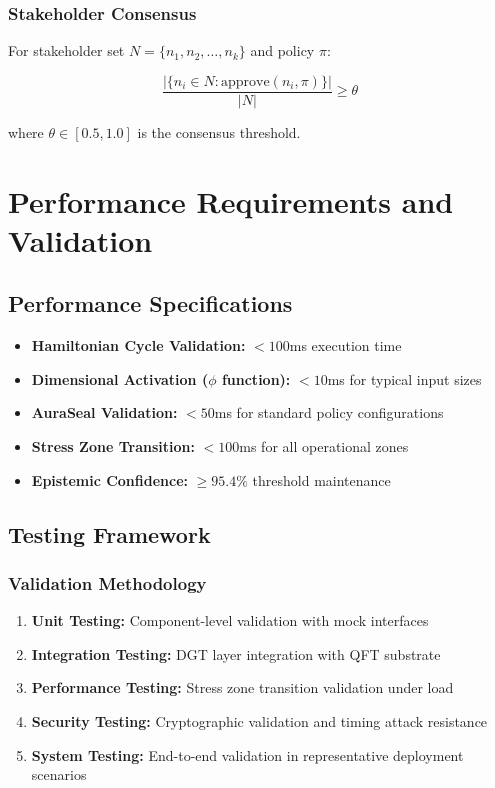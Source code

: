 \documentclass[12pt]{article}
\begin{document}
\subsubsection{Stakeholder Consensus}

For stakeholder set $N = \{n_1, n_2, \ldots, n_k\}$ and policy $\pi$:

\begin{equation}
\frac{|\{n_i \in N : \text{approve}(n_i, \pi)\}|}{|N|} \geq \theta
\end{equation}

where $\theta \in [0.5, 1.0]$ is the consensus threshold.

\section{Performance Requirements and Validation}

\subsection{Performance Specifications}

\begin{itemize}
    \item \textbf{Hamiltonian Cycle Validation:} $< 100$ms execution time
    \item \textbf{Dimensional Activation ($\phi$ function):} $< 10$ms for typical input sizes
    \item \textbf{AuraSeal Validation:} $< 50$ms for standard policy configurations
    \item \textbf{Stress Zone Transition:} $< 100$ms for all operational zones
    \item \textbf{Epistemic Confidence:} $\geq 95.4\%$ threshold maintenance
\end{itemize}

\subsection{Testing Framework}

\subsubsection{Validation Methodology}

\begin{enumerate}
    \item \textbf{Unit Testing:} Component-level validation with mock interfaces
    \item \textbf{Integration Testing:} DGT layer integration with QFT substrate
    \item \textbf{Performance Testing:} Stress zone transition validation under load
    \item \textbf{Security Testing:} Cryptographic validation and timing attack resistance
    \item \textbf{System Testing:} End-to-end validation in representative deployment scenarios
\end{enumerate}
\end{document}
